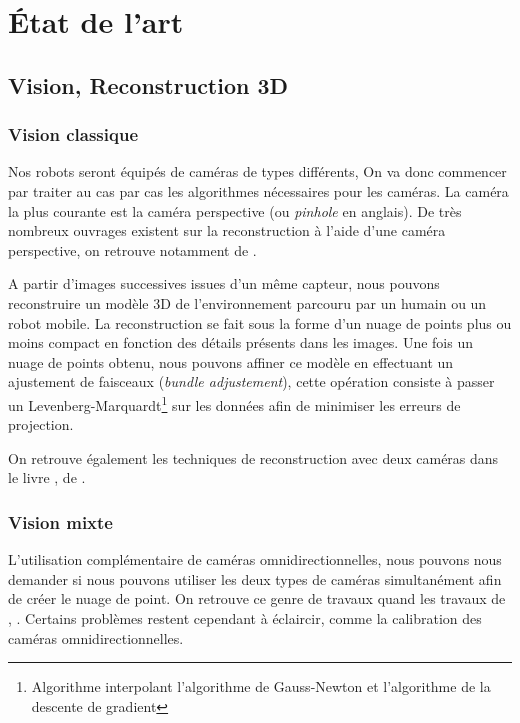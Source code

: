 \section{État de l'art}

\subsection{Vision, Reconstruction 3D}

\subsubsection{Vision classique}

Nos robots seront équipés de caméras de types différents, On va donc commencer par traiter au cas par cas les algorithmes nécessaires pour les caméras.
La caméra la plus courante est la caméra perspective (ou \textit{pinhole} en anglais).
De très nombreux ouvrages existent sur la reconstruction à l'aide d'une caméra perspective, on retrouve notamment   de \citeauthor{Hartley03Book} \cite{Hartley03Book}.

A partir d'images successives issues d'un même capteur, nous pouvons reconstruire un modèle 3D de l'environnement parcouru par un humain ou un robot mobile.
La reconstruction se fait sous la forme d'un nuage de points plus ou moins compact en fonction des détails présents dans les images.
Une fois un nuage de points obtenu, nous pouvons affiner ce modèle en effectuant un ajustement de faisceaux (\textit{bundle adjustement}), cette opération consiste à passer un Levenberg-Marquardt\footnote{Algorithme interpolant l'algorithme de Gauss-Newton et l'algorithme de la descente de gradient} sur les données afin de minimiser les erreurs de projection.

On retrouve également les techniques de reconstruction avec deux caméras dans le livre \cite{HoraudBook},  de \citeauthor{HoraudBook}.



\subsubsection{Vision mixte}

L'utilisation complémentaire de caméras omnidirectionnelles, nous pouvons nous demander si nous pouvons utiliser les deux types de caméras simultanément afin de créer le nuage de point.
On retrouve ce genre de travaux quand les travaux de
\citeauthor{Sturm02},  \cite{Sturm02}.
Certains problèmes restent cependant à éclaircir, comme la calibration des caméras omnidirectionnelles.

